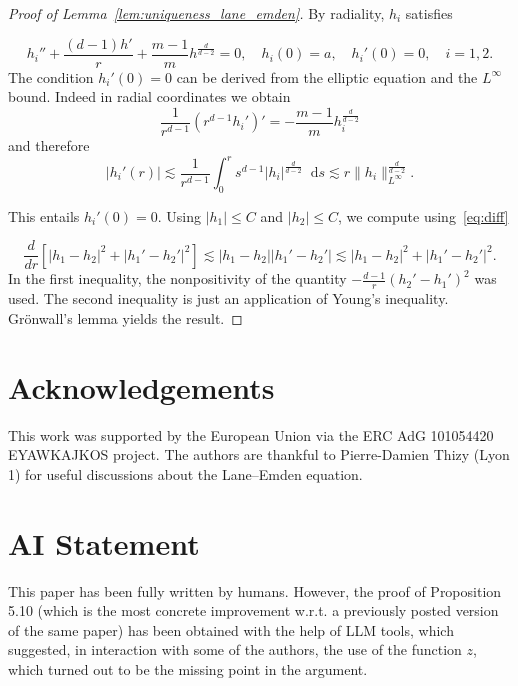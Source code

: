 \documentclass[11pt,a4paper]{article}
\numberwithin{equation}{section}
\theoremstyle{plain}
\theoremstyle{remark}
\newcommand {\f}{\frac}
\newcommand{\diff}{\mathop{}\!\mathrm{d}}
\begin{document}
\begin{proof}[Proof of Lemma~\ref{lem:uniqueness_lane_emden}]
By radiality, $h_{i}$ satisfies  

\begin{equation}\label{eq:diff}
h_i'' + \f{(d-1)h'}{r}  +\f{m-1}{m}h^{\f{d}{d-2}}=0, \quad h_i(0)=a,\quad h_i'(0)=0,\quad i=1,2. 
\end{equation}
The condition $h_i'(0)=0$ can be derived from the elliptic equation and the $L^{\infty}$ bound. Indeed in radial coordinates we obtain
$$
\f{1}{r^{d-1}}(r^{d-1}h_i')'=-\f{m-1}{m}h_i^{\f{d}{d-2}}
$$
and therefore 
$$
|h_i'(r)|\lesssim \f{1}{r^{d-1}}\int_{0}^{r}s^{d-1}|h_i|^{\f{d}{d-2}}\diff s\lesssim r\|h_i\|_{L^{\infty}}^{\f{d}{d-2}}.
$$

This entails $h_i'(0)=0$. Using $|h_1|\le C$ and $|h_2|\le C$, we compute using~\eqref{eq:diff}

$$
\f{d}{dr}\left[|h_1-h_2|^2 + |h_1'-h_2'|^2\right]\lesssim |h_1-h_2| |h_1'-h_2'|\lesssim |h_1-h_2|^2 +  |h_1'-h_2'|^2. 
$$
In the first inequality, the nonpositivity of the quantity $-\f{d-1}{r}(h_2'-h_1')^2$ was used. The second inequality is just an application of Young's inequality. 
Gr\"onwall's lemma yields the result.     
\end{proof}
\fi

\section*{Acknowledgements}

This work was supported by the European Union via the ERC AdG 101054420 EYAWKAJKOS project. The authors are thankful to Pierre-Damien Thizy (Lyon 1) for useful discussions about the Lane--Emden equation.

\section*{AI Statement}

This paper has been fully written by humans. However, the proof of Proposition 5.10 (which is the most concrete improvement w.r.t. a previously posted version of the same paper) has been obtained with the help of LLM tools, which suggested, in interaction with some of the authors, the use of the function $z$, which turned out to be the missing point in the argument. 
\end{document}
